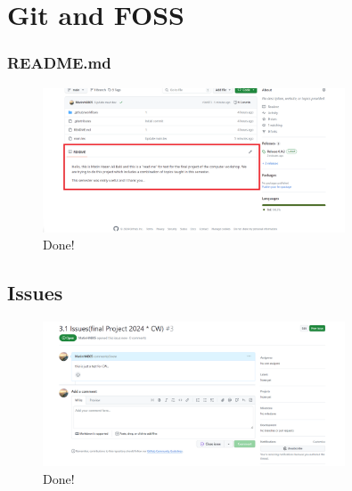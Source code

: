 \documentclass[12pt]{article}
\begin{document}
\section{Git and FOSS}

\subsubsection{README.md}
\begin{figure}

  \centering

\includegraphics[width=0.8\textwidth]{read.png}

\caption{Done!}


\end{figure}

\subsection{Issues}
\begin{figure}

  \centering

\includegraphics[width=0.8\textwidth]{is.png}

\caption{Done!}


\end{figure}
\end{document}

